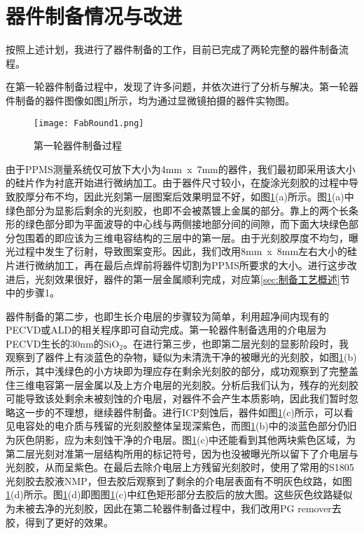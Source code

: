             \section{器件制备情况与改进} %
            \label{sec:器件制备情况与改进}
                按照上述计划，我进行了器件制备的工作，目前已完成了两轮完整的器件制备流程。

                在第一轮器件制备过程中，发现了许多问题，并依次进行了分析与解决。第一轮器件制备的器件图像如图\ref{fig:FabRound1}所示，均为通过显微镜拍摄的器件实物图。

            \begin{figure}[h]
                \centering
                \texttt{[image: FabRound1.png]}
                \caption{第一轮器件制备过程}
                \label{fig:FabRound1}
            \end{figure}

            由于PPMS测量系统仅可放下大小为4mm~x~7mm的器件，我们最初即采用该大小的硅片作为衬底开始进行微纳加工。由于器件尺寸较小，在旋涂光刻胶的过程中导致胶厚分布不均，因此光刻第一层图案后效果明显不好，如图\ref{fig:FabRound1}(a)所示。图\ref{fig:FabRound1}(a)中绿色部分为显影后剩余的光刻胶，也即不会被蒸镀上金属的部分。靠上的两个长条形的绿色部分即为平面波导的中心线与两侧接地部分间的间隙，而下面大块绿色部分包围着的即应该为三维电容结构的三层中的第一层。由于光刻胶厚度不均匀，曝光过程中发生了衍射，导致图案变形。因此，我们改用8mm~x~8mm左右大小的硅片进行微纳加工，再在最后点焊前将器件切割为PPMS所要求的大小。进行这步改进后，光刻效果很好，器件的第一层金属顺利完成，对应第\ref{sec:制备工艺概述}节中的步骤1。

            器件制备的第二步，也即生长介电层的步骤较为简单，利用超净间内现有的PECVD或ALD的相关程序即可自动完成。第一轮器件制备选用的介电层为PECVD生长的30nm的SiO$_2$。在进行第三步，也即第二层光刻的显影阶段时，我观察到了器件上有淡蓝色的杂物，疑似为未清洗干净的被曝光的光刻胶，如图\ref{fig:FabRound1}(b)所示，其中浅绿色的小方块即为理应存在剩余光刻胶的部分，成功观察到了完整盖住三维电容第一层金属以及上方介电层的光刻胶。分析后我们认为，残存的光刻胶可能导致该处剩余未被刻蚀的介电层，对器件不会产生本质影响，因此我们暂时忽略这一步的不理想，继续器件制备。进行ICP刻蚀后，器件如图\ref{fig:FabRound1}(c)所示，可以看见电容处的电介质与残留的光刻胶整体呈现深紫色，而图\ref{fig:FabRound1}(b)中的淡蓝色部分仍旧为灰色阴影，应为未刻蚀干净的介电层。图\ref{fig:FabRound1}(c)中还能看到其他两块紫色区域，为第二层光刻对准第一层结构所用的标记符号，因为也没被曝光所以留下了介电层与光刻胶，从而呈紫色。在最后去除介电层上方残留光刻胶时，使用了常用的S1805光刻胶去胶液NMP，但去胶后观察到了剩余的介电层表面有不明灰色纹路，如图\ref{fig:FabRound1}(d)所示。图\ref{fig:FabRound1}(d)即图图\ref{fig:FabRound1}(c)中红色矩形部分去胶后的放大图。这些灰色纹路疑似为未被去净的光刻胶，因此在第二轮器件制备过程中，我们改用PG remover去胶，得到了更好的效果。

